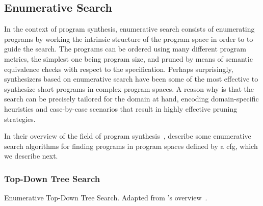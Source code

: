 \subsection{Enumerative Search}
\label{sec:enumerative-search}

In the context of program synthesis, enumerative search consists of enumerating
programs by working the intrinsic structure of the program space in order to to
guide the search.
The programs can be ordered using many different program metrics, the simplest
one being program size, and pruned by means of semantic equivalence checks with
respect to the specification.
Perhaps surprisingly, synthesizers based on enumerative search have been some of
the most effective to synthesize short programs in complex program spaces.
A reason why is that the search can be precisely tailored for the domain at
hand, encoding domain-specific heuristics and case-by-case scenarios that
result in highly effective pruning strategies.

In their overview of the field of program synthesis~\cite{Gulwani2017},
\citeauthor{Gulwani2017} describe some enumerative search algorithms for finding
programs in program spaces defined by a \Gls{cfg}, which we describe next.

\subsubsection{Top-Down Tree Search}
\label{sec:top-down-tree-search}

\begin{algorithm}
  \DontPrintSemicolon
  \LinesNotNumbered




  \caption{Enumerative Top-Down Tree Search.
    Adapted from \citeauthor{Gulwani2017}'s overview~\cite{Gulwani2017}.}
  \label{alg:enum-top-down}
\end{algorithm}

